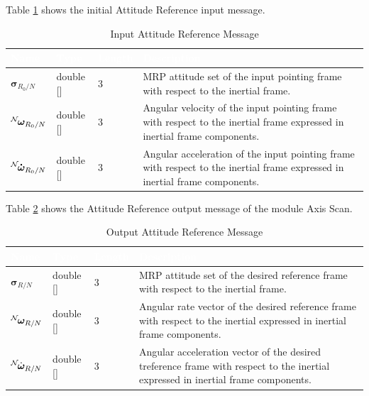 \documentclass[]{AVSSimReportMemo}
\begin{document}
Table \ref{tab:inputRefTable} shows the initial Attitude Reference input message.
\begin{table}[h!]
	\centering
	\caption{Input Attitude Reference Message}
	\begin{tabular}{|l|l|l|p{3in}|}
		\hline
		\rowcolor{BrickRed}
		\textcolor{white}{Name} & \textcolor{white}{Type} & 
		\textcolor{white}{Length} & 
		\textcolor{white}{Description}  \\ \hline
		$\bm{\sigma}_{R_0/N}$ & double [] & 3 & 
		MRP attitude set of the input pointing frame with respect to the inertial frame. \\ \hline
		$\leftexp{N} {\bm{\omega}_{R_0/N}}$ & double [] & 3 & 
		Angular velocity of the input pointing frame with respect to the inertial frame expressed in inertial frame components. \\ \hline
		$\leftexp{N} {\bm{\dot{\omega}}_{R_0/N}}$ & double [] & 3 & 
		Angular acceleration of the input pointing frame with respect to the inertial frame expressed in inertial frame components. \\ \hline
	\end{tabular}
	\label{tab:inputRefTable}
\end{table}

Table \ref{tab:outputTable} shows the Attitude Reference output message of the module Axis Scan.
\begin{table}[h!]
	\centering
	\caption{Output Attitude Reference Message}
	\begin{tabular}{|l|l|l|p{3in}|}
		\hline
		\rowcolor{BrickRed}
		\textcolor{white}{Name} & \textcolor{white}{Type} & 
		\textcolor{white}{Length} & 
		\textcolor{white}{Description}  \\ \hline
		$\bm{\sigma}_{R/N}$ & double [] & 3 & 
		MRP attitude set of the desired reference frame with respect to the inertial frame. \\ \hline
		$\leftexp{N} {\bm{\omega}_{R/N}}$ & double [] & 3 & 
		Angular rate vector of the desired reference frame with respect to the inertial expressed in inertial frame components. \\ \hline
		$\leftexp{N} {\dot{\bm{\omega}}_{R/N}}$ & double [] & 3 & 
		Angular acceleration vector of the desired treference frame with respect to the inertial expressed in inertial frame components. \\ \hline
	\end{tabular}
	\label{tab:outputTable}
\end{table}
\newpage
\end{document}
